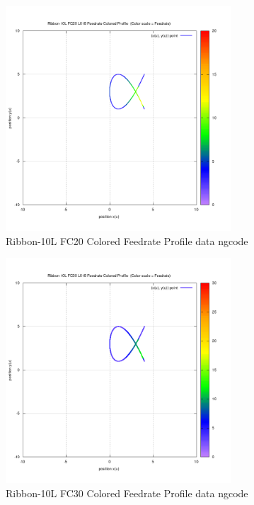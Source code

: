 \begin{figure}
	\caption     {Ribbon-10L FC20 Colored Feedrate Profile data ngcode}
	\label{18-img-Ribbon-10L-FC20-Colored-Feedrate-Profile-data_ngcode.png}
\includegraphics[width=0.75\textwidth]{Chap4/appendix/app-Ribbon-10L/plots/18-img-Ribbon-10L-FC20-Colored-Feedrate-Profile-data_ngcode.png}
\end{figure}

\clearpage
\pagebreak

\begin{figure}
	\caption     {Ribbon-10L FC30 Colored Feedrate Profile data ngcode}
	\label{19-img-Ribbon-10L-FC30-Colored-Feedrate-Profile-data_ngcode.png}
\includegraphics[width=0.75\textwidth]{Chap4/appendix/app-Ribbon-10L/plots/19-img-Ribbon-10L-FC30-Colored-Feedrate-Profile-data_ngcode.png}
\end{figure}


